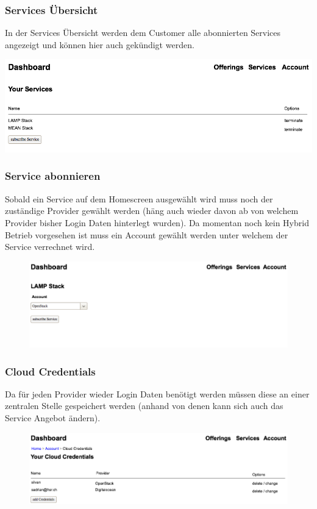 \documentclass[11pt]{scrartcl}
\begin{document}
\subsubsection{Services Übersicht}
In der Services Übersicht werden dem Customer alle abonnierten Services 
angezeigt und können hier auch gekündigt werden.

\includegraphics[width=\textwidth]{services_overview}


\subsubsection{Service abonnieren}
Sobald ein Service auf dem Homescreen ausgewählt wird muss noch der zuständige 
Provider gewählt werden (häng auch wieder davon ab von welchem Provider bisher Login Daten hinterlegt 
wurden).
Da momentan noch kein Hybrid Betrieb vorgesehen ist muss ein Account gewählt 
werden unter welchem der Service verrechnet wird.
\begin{figure}[h]
  \includegraphics[width=\textwidth]{service_settings}
\end{figure}

\newpage
\subsubsection{Cloud Credentials}
Da für jeden Provider wieder Login Daten benötigt werden müssen diese an einer 
zentralen Stelle gespeichert werden (anhand von denen kann sich auch das Service Angebot 
ändern).
\begin{figure}[h]
\includegraphics[width=\textwidth]{service_accounts}
\end{figure}
\end{document}
